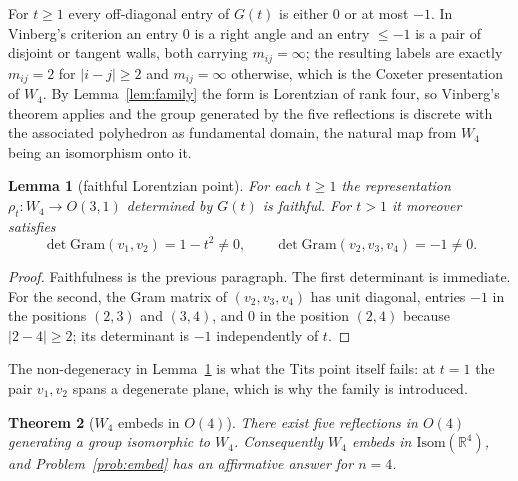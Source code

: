 \documentclass[11pt]{article}
\newtheorem{theorem}{Theorem}[section]
\newtheorem{lemma}[theorem]{Lemma}
\theoremstyle{definition}
\theoremstyle{remark}
\theoremstyle{definition}
\newcommand{\R}{\mathbb{R}}
\begin{document}
For $t\ge1$ every off-diagonal entry of $G(t)$ is either $0$ or at most $-1$. In Vinberg's
criterion an entry $0$ is a right angle and an entry $\le-1$ is a pair of disjoint or tangent
walls, both carrying $m_{ij}=\infty$; the resulting labels are exactly $m_{ij}=2$ for $|i-j|\ge2$
and $m_{ij}=\infty$ otherwise, which is the Coxeter presentation of $W_4$. By
Lemma~\ref{lem:family} the form is Lorentzian of rank four, so Vinberg's theorem
\cite{vinberg1971} applies and the group generated by the five reflections is discrete with the
associated polyhedron as fundamental domain, the natural map from $W_4$ being an isomorphism onto
it.

\begin{lemma}[faithful Lorentzian point]\label{lem:lorpoint}
For each $t\ge1$ the representation $\rho_t\colon W_4\to O(3,1)$ determined by $G(t)$ is faithful.
For $t>1$ it moreover satisfies
\[
  \det\mathrm{Gram}(v_1,v_2)=1-t^2\neq0,\qquad \det\mathrm{Gram}(v_2,v_3,v_4)=-1\neq0 .
\]
\end{lemma}

\begin{proof}
Faithfulness is the previous paragraph. The first determinant is immediate. For the second, the
Gram matrix of $(v_2,v_3,v_4)$ has unit diagonal, entries $-1$ in the positions $(2,3)$ and
$(3,4)$, and $0$ in the position $(2,4)$ because $|2-4|\ge2$; its determinant is $-1$
independently of $t$.
\end{proof}

The non-degeneracy in Lemma~\ref{lem:lorpoint} is what the Tits point itself fails: at $t=1$ the
pair $v_1,v_2$ spans a degenerate plane, which is why the family is introduced.

\begin{theorem}[$W_4$ embeds in $O(4)$]\label{thm:w4embed}
There exist five reflections in $O(4)$ generating a group isomorphic to $W_4$. Consequently $W_4$
embeds in $\mathrm{Isom}(\R^4)$, and Problem~\ref{prob:embed} has an affirmative answer for $n=4$.
\end{theorem}
\end{document}
